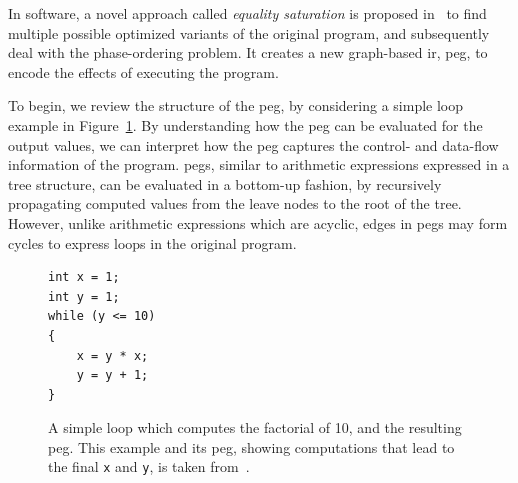 In software, a novel approach called \emph{equality saturation} is proposed
in~\cite{tate09} to find multiple possible optimized variants of the original
program, and subsequently deal with the phase-ordering problem.  It creates a
new graph-based \gls{ir}, \gls{peg}, to encode the effects of executing the
program.

To begin, we review the structure of the \gls{peg}, by considering a simple
loop example in Figure~\ref{bg:fig:factorial}.  By understanding how the
\gls{peg} can be evaluated for the output values, we can interpret how the
\gls{peg} captures the control- and data-flow information of the program.
\glspl{peg}, similar to arithmetic expressions expressed in a tree structure,
can be evaluated in a bottom-up fashion, by recursively propagating computed
values from the leave nodes to the root of the tree.  However, unlike
arithmetic expressions which are acyclic, edges in \glspl{peg} may form cycles
to express loops in the original program.
\begin{figure}[ht]
    \newsavebox{\factlstbox}
    \begin{lrbox}{\factlstbox}
    \begin{lstlisting}
int x = 1;
int y = 1;
while (y <= 10)
{
    x = y * x;
    y = y + 1;
}
    \end{lstlisting}
    \end{lrbox}
    \centering
    \caption{%
        A simple loop which computes the factorial of 10, and the resulting
        \gls{peg}\@.  This example and its \gls{peg}, showing computations
        that lead to the final \texttt{x} and \texttt{y}, is taken
        from~\cite{tate09}.
    }\label{bg:fig:factorial}
\end{figure}

